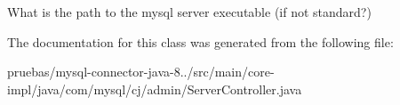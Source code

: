What is the path to the mysql server executable (if not standard?) 

The documentation for this class was generated from the following file\+:\begin{DoxyCompactItemize}
\item 
pruebas/mysql-\/connector-\/java-\/8../src/main/core-\/impl/java/com/mysql/cj/admin/Server\+Controller.\+java\end{DoxyCompactItemize}
